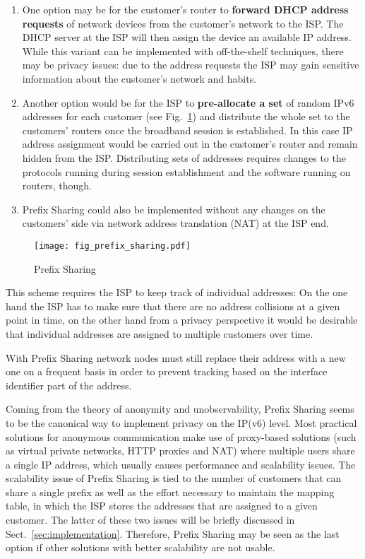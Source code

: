 \documentclass{easychair}
\begin{document}
\begin{enumerate}
    \item One option may be for the customer's router to \textbf{forward DHCP address requests} of network devices from the customer's network to the ISP. The DHCP server at the ISP will then assign the device an available IP address. While this variant can be implemented with off-the-shelf techniques, there may be privacy issues: due to the address requests the ISP may gain sensitive information about the customer's network and habits.
    \item Another option would be for the ISP to \textbf{pre-allocate a set} of random IPv6 addresses for each customer (see Fig.~\ref{fig:fig_prefix_sharing}) and distribute the whole set to the customers' routers once the broadband session is established. In this case IP address assignment would be carried out in the customer's router and remain hidden from the ISP. Distributing sets of addresses requires changes to the protocols running during session establishment and the software running on routers, though.
    \item Prefix Sharing could also be implemented without any changes on the customers' side via network address translation (NAT) at the ISP end.
\end{enumerate}

\begin{figure}[htbp]
        \centering
                \texttt{[image: fig\_prefix\_sharing.pdf]}
        \caption{Prefix Sharing}
        \label{fig:fig_prefix_sharing}
\end{figure}

This scheme requires the ISP to keep track of individual addresses: On the one hand the ISP has to make sure that there are no address collisions at a given point in time, on the other hand from a privacy perspective it would be desirable that individual addresses are assigned to multiple customers over time.

With Prefix Sharing network nodes must still replace their address with a new one on a frequent basis in order to prevent tracking based on the interface identifier part of the address.

Coming from the theory of anonymity and unobservability, Prefix Sharing seems to be the canonical way to implement privacy on the IP(v6) level. Most practical solutions for anonymous communication make use of proxy-based solutions (such as virtual private networks, HTTP proxies and NAT) where multiple users share a single IP address, which usually causes performance and scalability issues. The scalability issue of Prefix Sharing is tied to the number of customers that can share a single prefix as well as the effort necessary to maintain the mapping table, in which the ISP stores the addresses that are assigned to a given customer. The latter of these two issues will be briefly discussed in Sect.~\ref{sec:implementation}. Therefore, Prefix Sharing may be seen as the last option if other solutions with better scalability are not usable.
\end{document}
